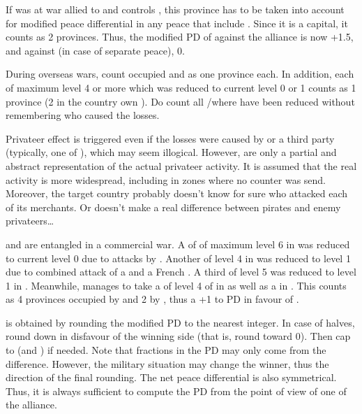 \begin{exemple}
  If \paysCrimee was at war allied to \TUR and \RUS controls \provinceCrimee,
  this province has to be taken into account for modified peace differential
  in any peace that include \TUR. Since it is a capital, it counts as 2
  provinces. Thus, the modified PD of \RUS against the alliance is now +1.5,
  and against \TUR (in case of separate peace), 0.
\end{exemple}

\bparag During overseas wars, count occupied \COL and \TP as one province
each.
 In addition, each \TradeFLEET of maximum level 4 or
more which was reduced to current level 0 or 1 counts as 1 province (2 in the
country own \CTZ).
\bparag Do count all \CTZ/\STZ where \TradeFLEET have been reduced without
remembering who caused the losses.

\begin{designnote}
  Privateer effect is triggered even if the losses were caused by
   or a third party \corsaire (typically, one of
  \Barbaresques), which may seem illogical. However, \corsaire are only a
  partial and abstract representation of the actual privateer activity. It is
  assumed that the real activity is more widespread, including in zones where
  no counter was send. Moreover, the target country probably doesn't know for
  sure who attacked each of its merchants. Or doesn't make a real difference
  between pirates and enemy privateers\ldots
\end{designnote}

\begin{exemple}
  \FRA and \ANG are entangled in a commercial war. A \TradeFLEET of \ANG of
  maximum level 6 in  was reduced to current level 0 due to
  attacks by \leaderBart. Another \TradeFLEET of level 4 in 
  was reduced to level 1 due to combined attack of a  \corsaire
  and a French \corsaire. A third \TradeFLEET of level 5 was reduced to level
  1 in . Meanwhile, \ANG manages to take a \COL of level 4 of \FRA
  in \granderegionQuebec as well as a \TP in \continentIndia. This counts as 4
  provinces occupied by \FRA and 2 by \ANG, thus a +1 to PD in favour of \FRA.
\end{exemple}

 is obtained by rounding the modified PD to
the nearest integer. In case of halves, round down in disfavour of the winning
side (that is, round toward 0). Then cap to  (and ) if
needed.
\bparag Note that fractions in the PD may only come from the \STAB
difference. However, the military situation may change the winner, thus the
direction of the final rounding.
\bparag The net peace differential is also symmetrical. Thus, it is always
sufficient to compute the PD from the point of view of one of the alliance.

